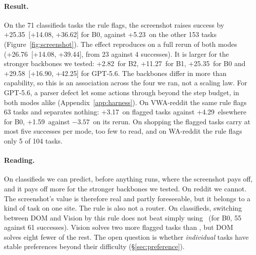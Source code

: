 \paragraph{Result.} On the 71 classifieds tasks the rule flags, the screenshot raises success by +25.35\pp\ [+14.08, +36.62] for B0, against +5.23\pp\ on the other 153 tasks (Figure~\ref{fig:screenshot}). %
The effect reproduces on a full rerun of both modes (+26.76\pp\ [+14.08, +39.44], from 23 against 4 successes). %
It is larger for the stronger backbones we tested: +2.82\pp\ for B2, +11.27\pp\ for B1, +25.35\pp\ for B0 and +29.58\pp\ [+16.90, +42.25] for GPT-5.6. The backbones differ in more than capability, so this is an association across the four we ran, not a scaling law. For GPT-5.6, a parser defect let some actions through beyond the step budget, in both modes alike (Appendix~\ref{app:harness}). %
On VWA-reddit the same rule flags 63 tasks and separates nothing: +3.17\pp\ on flagged tasks against +4.29\pp\ elsewhere for B0, +1.59\pp\ against $-3.57$\pp\ on its rerun. %
On shopping the flagged tasks carry at most five successes per mode, too few to read, and on WA-reddit the rule flags only 5 of 104 tasks.

\paragraph{Reading.} On classifieds we can predict, before anything runs, where the screenshot pays off, and it pays off more for the stronger backbones we tested. On reddit we cannot. The screenshot's value is therefore real and partly foreseeable, but it belongs to a kind of task on one site. The rule is also not a router. On classifieds, switching between DOM and Vision by this rule does not beat simply using \SoM\ (for B0, 55 against 61 successes). Vision solves two more flagged tasks than \SoM, but DOM solves eight fewer of the rest. The open question is whether \emph{individual} tasks have stable preferences beyond their difficulty (\S\ref{sec:preference}).
